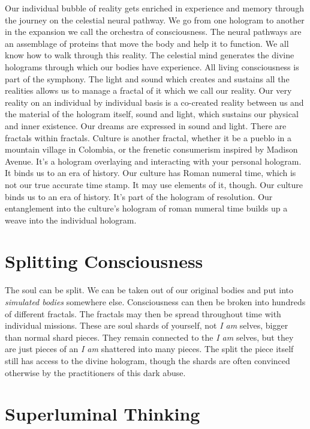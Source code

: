 \documentclass[letterpaper,9pt,twoside,titlepage,onecolumn,openany]{book}
\begin{document}
Our individual bubble of reality gets enriched in experience and memory
through the journey on the celestial neural pathway. We go from one
hologram to another in the expansion we call the orchestra of
consciousness. The neural pathways are an assemblage of proteins that
move the body and help it to function. We all know how to walk through
this reality. The celestial mind generates the divine holograms through
which our bodies have experience. All living consciousness is part of
the symphony. The light and sound which creates and sustains all the
realities allows us to manage a fractal of it which we call our reality.
Our very reality on an individual by individual basis is a co-created
reality between us and the material of the hologram itself, sound and
light, which sustains our physical and inner existence. Our dreams are
expressed in sound and light. There are fractals within fractals.
Culture is another fractal, whether it be a pueblo in a mountain village
in Colombia, or the frenetic consumerism inspired by Madison Avenue.
It's a hologram overlaying and interacting with your personal hologram.
It binds us to an era of history. Our culture has Roman numeral time,
which is not our true accurate time stamp. It may use elements of it,
though. Our culture binds us to an era of history. It's part of the
hologram of resolution. Our entanglement into the culture's hologram of
roman numeral time builds up a weave into the individual hologram.

\section*{Splitting Consciousness}\label{splitting-consciousness}

The soul can be split. We can be taken out of our original bodies and
put into \emph{simulated bodies} somewhere else. Consciousness can then
be broken into hundreds of different fractals. The fractals may then be
spread throughout time with individual missions. These are soul shards
of yourself, not \emph{I am} selves, bigger than normal shard pieces.
They remain connected to the \emph{I am} selves, but they are just
pieces of an \emph{I am} shattered into many pieces. The split the piece
itself still has access to the divine hologram, though the shards are
often convinced otherwise by the practitioners of this dark abuse.

\section*{Superluminal Thinking}\label{superluminal-thinking}
\end{document}
